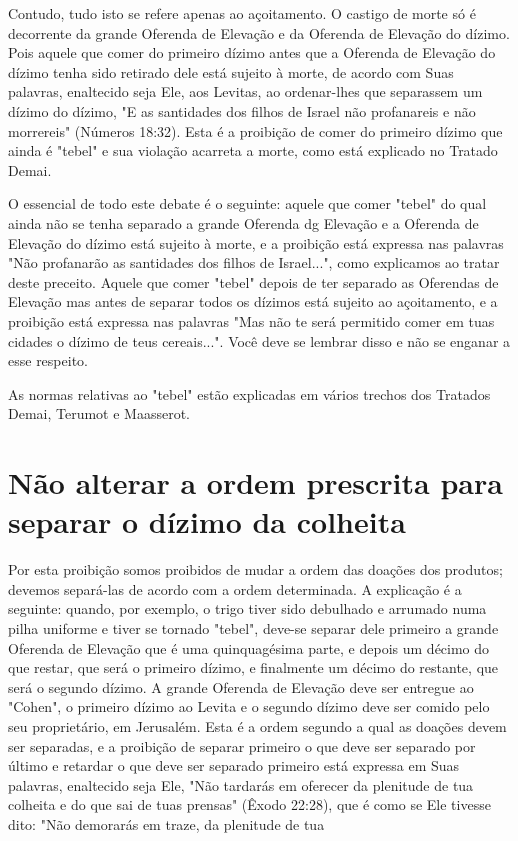 \begin{itemize}
\begin{enumrate}
\begin{itemize}
\begin{itemize}
\begin{itemize}
Contudo, tudo isto se refere apenas ao açoitamento. O castigo de morte
só é decorrente da grande Oferenda de Elevação e da Oferenda de
Ele­vação do dízimo. Pois aquele que comer do primeiro dízimo antes que
a Ofe­renda de Elevação do dízimo tenha sido retirado dele está sujeito
à morte, de acordo com Suas palavras, enaltecido seja Ele, aos Levitas,
ao ordenar-lhes que separassem um dízimo do dízimo, "E as santidades dos
filhos de Israel não pro­fanareis e não morrereis" (Números 18:32). Esta
é a proibição de comer do pri­meiro dízimo que ainda é "tebel" e sua
violação acarreta a morte, como está explicado no Tratado Demai.

O essencial de todo este debate é o seguinte: aquele que comer "te­bel"
do qual ainda não se tenha separado a grande Oferenda dg Elevação e a
Oferenda de Elevação do dízimo está sujeito à morte, e a proibição está
expres­sa nas palavras "Não profanarão as santidades dos filhos de
Israel...", como ex­plicamos ao tratar deste preceito. Aquele que comer
"tebel" depois de ter se­parado as Oferendas de Elevação mas antes de
separar todos os dízimos está sujeito ao açoitamento, e a proibição está
expressa nas palavras "Mas não te será permitido comer em tuas cidades o
dízimo de teus cereais...". Você deve se lembrar disso e não se enganar
a esse respeito.

As normas relativas ao "tebel" estão explicadas em vários trechos dos
Tratados Demai, Terumot e Maasserot.

\section{Não alterar a ordem prescrita para separar o dízimo da colheita}

Por esta proibição somos proibidos de mudar a ordem das doações dos
produtos; devemos separá-las de acordo com a ordem determinada. A
ex­plicação é a seguinte: quando, por exemplo, o trigo tiver sido
debulhado e ar­rumado numa pilha uniforme e tiver se tornado "tebel",
deve-se separar dele primeiro a grande Oferenda de Elevação que é uma
quinquagésima parte, e de­pois um décimo do que restar, que será o
primeiro dízimo, e finalmente um décimo do restante, que será o segundo
dízimo. A grande Oferenda de Eleva­ção deve ser entregue ao "Cohen", o
primeiro dízimo ao Levita e o segundo dízimo deve ser comido pelo seu
proprietário, em Jerusalém. Esta é a ordem segundo a qual as doações
devem ser separadas, e a proibição de separar pri­meiro o que deve ser
separado por último e retardar o que deve ser separado primeiro está
expressa em Suas palavras, enaltecido seja Ele, "Não tardarás em
oferecer da plenitude de tua colheita e do que sai de tuas prensas"
(Êxodo 22:28), que é como se Ele tivesse dito: "Não demorarás em traze,
da plenitude de tua



\end{itemize}
\end{itemize}
\end{itemize}
\end{enumrate}
\end{itemize}
